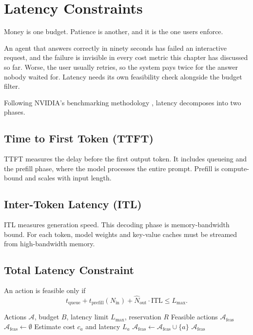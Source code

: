 \section{Latency Constraints}

Money is one budget. Patience is another, and it is the one users enforce.

An agent that answers correctly in ninety seconds has failed an interactive
request, and the failure is invisible in every cost metric this chapter has
discussed so far. Worse, the user usually retries, so the system pays twice for
the answer nobody waited for. Latency needs its own feasibility check alongside
the budget filter.

Following NVIDIA’s benchmarking methodology \cite{nvidia2024benchmarking}, latency decomposes into two phases.

\subsection{Time to First Token (TTFT)}

TTFT measures the delay before the first output token. It includes queueing and the prefill phase, where the model processes the entire prompt. Prefill is compute-bound and scales with input length.

\subsection{Inter-Token Latency (ITL)}

ITL measures generation speed. This decoding phase is memory-bandwidth bound. For each token, model weights and key-value caches must be streamed from high-bandwidth memory.

\subsection{Total Latency Constraint}

An action is feasible only if
\[
t_{\text{queue}} + t_{\text{prefill}}(N_{\text{in}}) +
\hat{N}_{\text{out}} \cdot \text{ITL} \leq L_{\max}.
\]

\begin{algorithm}
\caption{Joint Cost-Latency Filtering}
\begin{algorithmic}[1]
\Require Actions $\mathcal{A}$, budget $B$, latency limit $L_{\max}$, reservation $R$
\Ensure Feasible actions $\mathcal{A}_{\text{feas}}$
\State $\mathcal{A}_{\text{feas}} \gets \emptyset$
    \State Estimate cost $c_a$ and latency $L_a$
        \State $\mathcal{A}_{\text{feas}} \gets \mathcal{A}_{\text{feas}} \cup \{a\}$
    \EndIf
\EndFor
\State \Return $\mathcal{A}_{\text{feas}}$
\end{algorithmic}
\end{algorithm}

